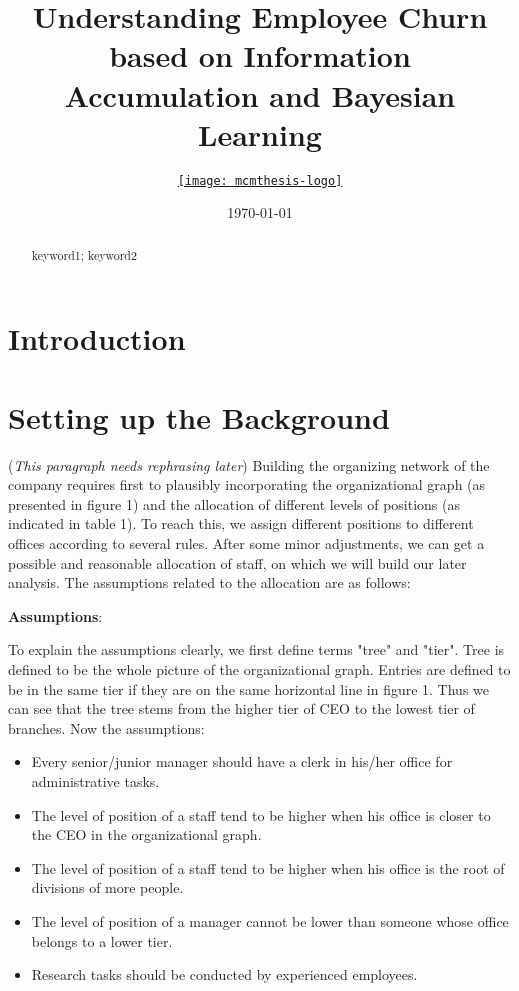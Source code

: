 \documentclass[tcn = 37075, sheet = true, abstract = true]{mcmthesis}
\title{Understanding Employee Churn based on Information Accumulation and Bayesian Learning}
\author{\small \href{http://www.latexstudio.net/}
  {\texttt{[image: mcmthesis-logo]}}}
\date{\today}
\begin{document}
\begin{abstract}
\lipsum[1]
\begin{keywords}
keyword1; keyword2
\end{keywords}
\end{abstract}
\maketitle
\newpage


\tableofcontents
\newpage
\section{Introduction}

\section{Setting up the Background}

(\textit{This paragraph needs rephrasing later}) Building the organizing network of the company requires first to plausibly incorporating the organizational graph (as presented in figure 1) and the allocation of different levels of positions (as indicated in table 1). To reach this, we assign different positions to different offices according to several rules. After some minor adjustments, we can get a possible and reasonable allocation of staff, on which we will build our later analysis. The assumptions related to the allocation are as follows:

\noindent \textbf{Assumptions}:

To explain the assumptions clearly, we first define terms "tree" and "tier". Tree is defined to be the whole picture of the organizational graph. Entries are defined to be in the same tier if they are on the same horizontal line in figure 1. Thus we can see that the tree stems from the higher tier of CEO to the lowest tier of branches. Now the assumptions:

\begin{itemize}
\item Every senior/junior manager should have a clerk in his/her office for administrative tasks.
\item The level of position of a staff tend to be higher when his office is closer to the CEO in the organizational graph.
\item The level of position of a staff tend to be higher when his office is the root of divisions of more people.
\item The level of position of a manager cannot be lower than someone whose office belongs to a lower tier.
\item Research tasks should be conducted by experienced employees.
\end{itemize}
\end{document}
